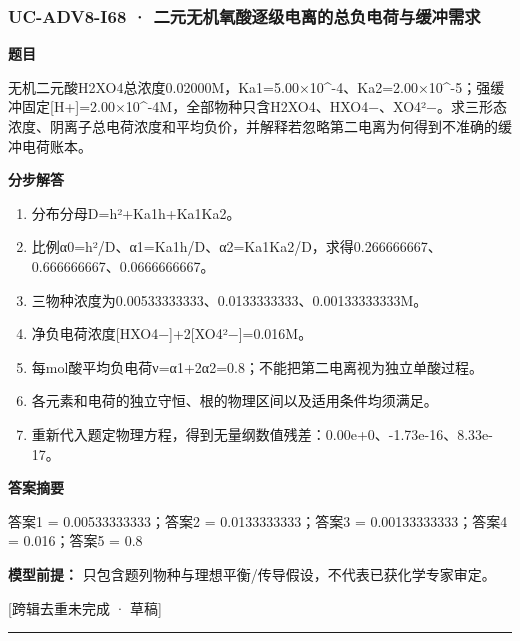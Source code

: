 \documentclass[UTF8,11pt,a4paper]{ctexart}
\begin{document}
\subsubsection*{UC-ADV8-I68 · 二元无机氧酸逐级电离的总负电荷与缓冲需求}
\noindent\textbf{题目}\par
无机二元酸H2XO4总浓度0.02000M，Ka1=5.00×10\textasciicircum{}-4、Ka2=2.00×10\textasciicircum{}-5；强缓冲固定[H+]=2.00×10\textasciicircum{}-4M，全部物种只含H2XO4、HXO4−、XO4²−。求三形态浓度、阴离子总电荷浓度和平均负价，并解释若忽略第二电离为何得到不准确的缓冲电荷账本。\par
\medskip\noindent\textbf{分步解答}
\begin{enumerate}
\item 分布分母D=h²+Ka1h+Ka1Ka2。
\item 比例α0=h²/D、α1=Ka1h/D、α2=Ka1Ka2/D，求得0.266666667、0.666666667、0.0666666667。
\item 三物种浓度为0.00533333333、0.0133333333、0.00133333333M。
\item 净负电荷浓度[HXO4−]+2[XO4²−]=0.016M。
\item 每mol酸平均负电荷ν=α1+2α2=0.8；不能把第二电离视为独立单酸过程。
\item 各元素和电荷的独立守恒、根的物理区间以及适用条件均须满足。
\item 重新代入题定物理方程，得到无量纲数值残差：0.00e+0、-1.73e-16、8.33e-17。
\end{enumerate}
\noindent\textbf{答案摘要}\par
答案1 = 0.00533333333；答案2 = 0.0133333333；答案3 = 0.00133333333；答案4 = 0.016；答案5 = 0.8\par
\noindent\textbf{模型前提：}
只包含题列物种与理想平衡/传导假设，不代表已获化学专家审定。\par
\noindent\textcolor{red!65!black}{[跨辑去重未完成 · 草稿]} \par
\medskip\hrule\medskip
{}
\end{document}
